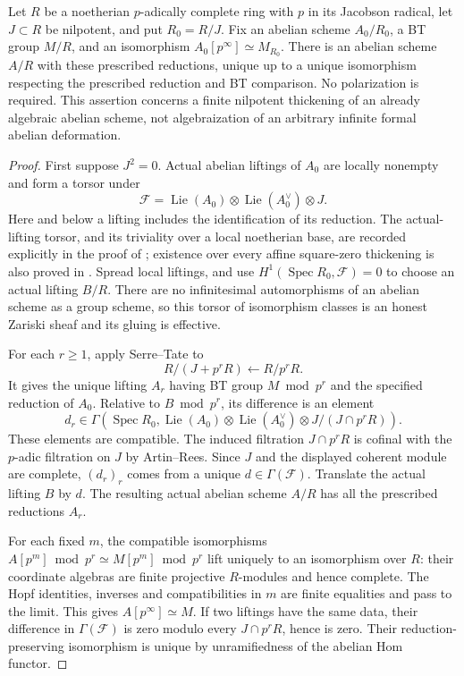 \begin{lemma}
\label{lem:C-RD12-complete}
Let $R$ be a noetherian $p$-adically complete ring with $p$ in its
Jacobson radical, let $J\subset R$ be nilpotent, and put $R_0=R/J$.
Fix an abelian scheme $A_0/R_0$, a BT group $M/R$, and an
isomorphism $A_0[p^\infty]\simeq M_{R_0}$. There is an abelian scheme
$A/R$ with these prescribed reductions, unique up to a unique
isomorphism respecting the prescribed reduction and BT comparison.
No polarization is required. This assertion concerns a finite
nilpotent thickening of an already algebraic abelian scheme, not
algebraization of an arbitrary infinite formal abelian deformation.
\end{lemma}
\begin{proof}
First suppose $J^2=0$. Actual abelian liftings of $A_0$ are locally
nonempty and form a torsor under
\[
 \mathcal F=\operatorname{Lie}(A_0)\otimes
             \operatorname{Lie}(A_0^\vee)\otimes J.
\]
Here and below a lifting includes the identification of its reduction.
The actual-lifting torsor, and its triviality over a local noetherian
base, are recorded explicitly in the proof of
\cite[Lemma~24, p.590]{VasiuZink2010Purity}; existence over every affine square-zero thickening is also
proved in \cite[Chapter~IV, Lemma~2.8.1, pp.148--149]{Messing1972}. Spread local liftings,
and use $H^1(\operatorname{Spec}R_0,\mathcal F)=0$ to choose an actual
lifting $B/R$. There are no infinitesimal automorphisms of an abelian
scheme as a group scheme, so this torsor of isomorphism classes is
an honest Zariski sheaf and its gluing is effective.

For each $r\geq1$, apply Serre--Tate to
\[
 R/(J+p^rR)\longleftarrow R/p^rR.
\]
It gives the unique lifting $A_r$ having BT group $M\bmod p^r$ and
the specified reduction of $A_0$. Relative to $B\bmod p^r$, its
difference is an element
\[
 d_r\in\Gamma\!\left(\operatorname{Spec}R_0,
   \operatorname{Lie}(A_0)\otimes\operatorname{Lie}(A_0^\vee)
        \otimes J/(J\cap p^rR)\right).
\]
These elements are compatible. The induced filtration
$J\cap p^rR$ is cofinal with the $p$-adic filtration on $J$ by
Artin--Rees. Since $J$ and the displayed coherent module are complete,
$(d_r)_r$ comes from a unique $d\in\Gamma(\mathcal F)$.
Translate the actual lifting $B$ by $d$. The resulting actual abelian
scheme $A/R$ has all the prescribed reductions $A_r$.

For each fixed $m$, the compatible isomorphisms
$A[p^m]\bmod p^r\simeq M[p^m]\bmod p^r$ lift uniquely to an
isomorphism over $R$: their coordinate algebras are finite projective
$R$-modules and hence complete. The Hopf identities, inverses and
compatibilities in $m$ are finite equalities and pass to the limit.
This gives $A[p^\infty]\simeq M$. If two liftings have the same data,
their difference in $\Gamma(\mathcal F)$ is zero modulo every
$J\cap p^rR$, hence is zero. Their reduction-preserving isomorphism
is unique by unramifiedness of the abelian Hom functor.


\end{proof}
